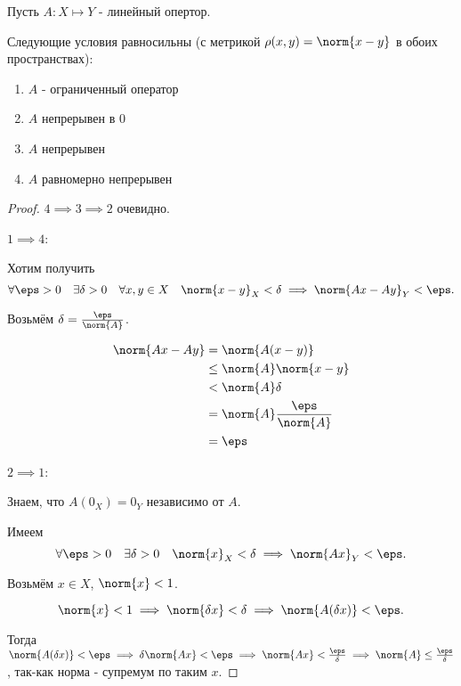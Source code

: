 
\begin{theorem} \thmslashn

    Пусть $A : X\mapsto Y$ - линейный опертор.

    Следующие условия равносильны (с метрикой $\rho(x, y) = \norm{x - y}$ в обоих пространствах):

    \begin{enumerate}
        \item $A$ - ограниченный оператор
        \item $A$ непрерывен в $0$
        \item $A$ непрерывен
        \item $A$ равномерно непрерывен
    \end{enumerate}
    \begin{proof} \thmslashn
    
        $4 \implies 3 \implies 2$ очевидно.

        $1 \implies 4$:

        Хотим получить 
        \[ \forall{\eps > 0}\quad \exists{\delta > 0}\quad \forall{x, y\in X}\quad \norm{x - y}_{X} < \delta \implies \norm{Ax - Ay}_{Y} < \eps .\] 

        Возьмём $\delta = \frac{\eps}{\norm{A}}$.

        \begin{equation*}
            \begin{split}
                \norm{Ax - Ay} 
                &= \norm{A(x-y)}\\
                &\le \norm{A} \norm{x - y}\\
                &< \norm{A} \delta\\
                &= \norm{A} \frac{\eps}{\norm{A}}\\
                &= \eps
            \end{split}
        \end{equation*}

        $2 \implies 1$:

        Знаем, что $A(0_{X}) = 0_{Y}$ независимо от $A$.

        Имеем 
        \[ \forall{\eps > 0}\quad \exists{\delta > 0}\quad \norm{x}_{X} < \delta \implies \norm{Ax}_{Y} < \eps.\]

        Возьмём $x\in X$, $\norm{x} < 1$.

        \[ \norm{x} < 1 \implies \norm{\delta x} < \delta \implies \norm{A(\delta x)} < \eps .\] 

        Тогда $\norm{A(\delta x)} < \eps \implies \delta \norm{Ax} < \eps \implies \norm{Ax} < \frac{\eps}{\delta} \implies \norm{A} \le \frac{\eps}{\delta}$, так-как норма - супремум по таким $x$.
    \end{proof}
\end{theorem}
